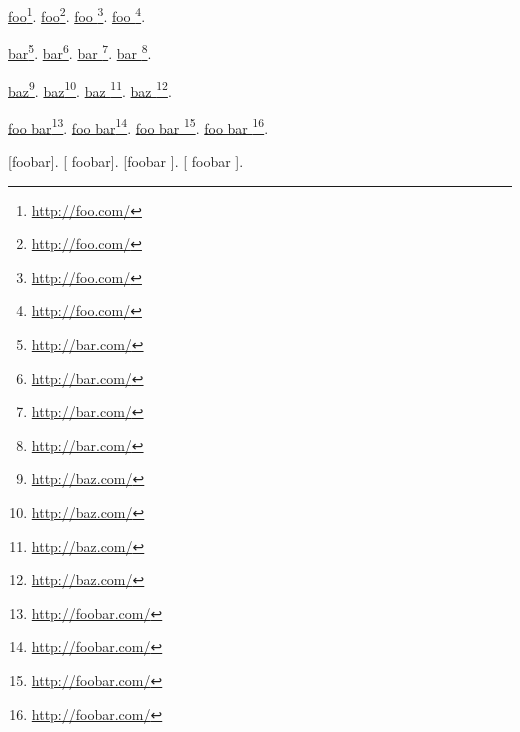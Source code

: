 
\def\mytitle{Link Labels}


\href{http://foo.com/}{foo}\footnote{\href{http://foo.com/}{http://foo.com/}}.
\href{http://foo.com/}{ foo}\footnote{\href{http://foo.com/}{http://foo.com/}}.
\href{http://foo.com/}{foo }\footnote{\href{http://foo.com/}{http://foo.com/}}.
\href{http://foo.com/}{ foo }\footnote{\href{http://foo.com/}{http://foo.com/}}.

\href{http://bar.com/}{bar}\footnote{\href{http://bar.com/}{http://bar.com/}}.
\href{http://bar.com/}{ bar}\footnote{\href{http://bar.com/}{http://bar.com/}}.
\href{http://bar.com/}{bar }\footnote{\href{http://bar.com/}{http://bar.com/}}.
\href{http://bar.com/}{ bar }\footnote{\href{http://bar.com/}{http://bar.com/}}.

\href{http://baz.com/}{baz}\footnote{\href{http://baz.com/}{http://baz.com/}}.
\href{http://baz.com/}{ baz}\footnote{\href{http://baz.com/}{http://baz.com/}}.
\href{http://baz.com/}{baz }\footnote{\href{http://baz.com/}{http://baz.com/}}.
\href{http://baz.com/}{ baz }\footnote{\href{http://baz.com/}{http://baz.com/}}.

\href{http://foobar.com/}{foo bar}\footnote{\href{http://foobar.com/}{http://foobar.com/}}.
\href{http://foobar.com/}{ foo bar}\footnote{\href{http://foobar.com/}{http://foobar.com/}}.
\href{http://foobar.com/}{foo bar }\footnote{\href{http://foobar.com/}{http://foobar.com/}}.
\href{http://foobar.com/}{ foo bar }\footnote{\href{http://foobar.com/}{http://foobar.com/}}.

[foobar].
[ foobar].
[foobar ].
[ foobar ].


